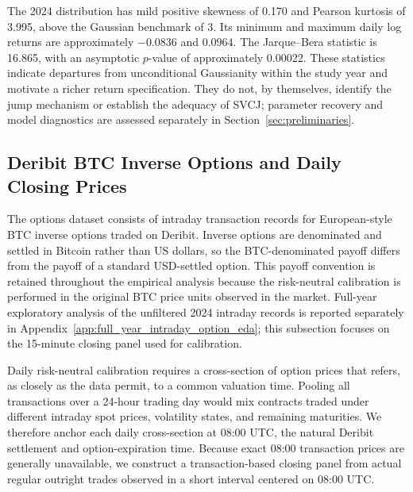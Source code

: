 The 2024 distribution has mild positive skewness of 0.170 and Pearson kurtosis of 3.995, above the Gaussian benchmark of 3. Its minimum and maximum daily log returns are approximately $-0.0836$ and $0.0964$. The Jarque--Bera statistic is 16.865, with an asymptotic $p$-value of approximately 0.00022. These statistics indicate departures from unconditional Gaussianity within the study year and motivate a richer return specification. They do not, by themselves, identify the jump mechanism or establish the adequacy of SVCJ; parameter recovery and model diagnostics are assessed separately in Section~\ref{sec:preliminaries}.



\subsection{Deribit BTC Inverse Options and Daily Closing Prices}
\label{subsec:deribit_filtered_options}

The options dataset consists of intraday transaction records for European-style BTC inverse options traded on Deribit. Inverse options are denominated and settled in Bitcoin rather than US dollars, so the BTC-denominated payoff differs from the payoff of a standard USD-settled option. This payoff convention is retained throughout the empirical analysis because the risk-neutral calibration is performed in the original BTC price units observed in the market. Full-year exploratory analysis of the unfiltered 2024 intraday records is reported separately in Appendix~\ref{app:full_year_intraday_option_eda}; this subsection focuses on the 15-minute closing panel used for calibration.

Daily risk-neutral calibration requires a cross-section of option prices that refers, as closely as the data permit, to a common valuation time. Pooling all transactions over a 24-hour trading day would mix contracts traded under different intraday spot prices, volatility states, and remaining maturities. We therefore anchor each daily cross-section at 08:00 UTC, the natural Deribit settlement and option-expiration time. Because exact 08:00 transaction prices are generally unavailable, we construct a transaction-based closing panel from actual regular outright trades observed in a short interval centered on 08:00 UTC.


